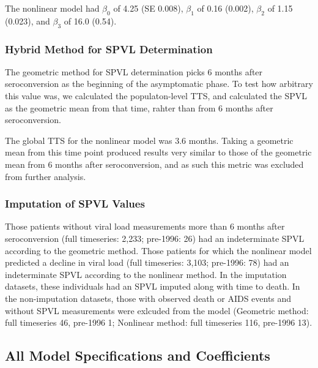 \documentclass[12pt, titlepage, proquest]{article}
\begin{document}
The nonlinear model had $\beta_{0}$ of 4.25 (SE 0.008), $\beta_{1}$ of 0.16 (0.002), $\beta_{2}$ of 1.15 (0.023), and $\beta_{3}$ of 16.0 (0.54). 

\subsubsection{Hybrid Method for SPVL Determination}

The geometric method for SPVL determination picks 6 months after seroconversion as the beginning of the asymptomatic phase. To test how arbitrary this value was, we calculated the populaton-level TTS, and calculated the SPVL as the geometric mean from that time, rahter than from 6 months after seroconversion. 

The global TTS for the nonlinear model was 3.6 months. Taking a geometric mean from this time point produced results very similar to those of the geometric mean from 6 months after seroconversion, and as such this metric was excluded from further analysis.

\subsubsection{Imputation of SPVL Values}

Those patients without viral load measurements more than 6 months after seroconversion (full timeseries: 2,233; pre-1996: 26) had an indeterminate SPVL according to the geometric method. Those patients for which the nonlinear model predicted a decline in viral load (full timeseries: 3,103; pre-1996: 78) had an indeterminate SPVL according to the nonlinear method. In the imputation datasets, these individuals had an SPVL imputed along with time to death. In the non-imputation datasets, those with observed death or AIDS events and without SPVL measurements were exlcuded from the model (Geometric method: full timeseries 46, pre-1996 1; Nonlinear method: full timeseries 116, pre-1996 13).


\subsection{All Model Specifications and Coefficients}

\printbibliography
\end{document}
